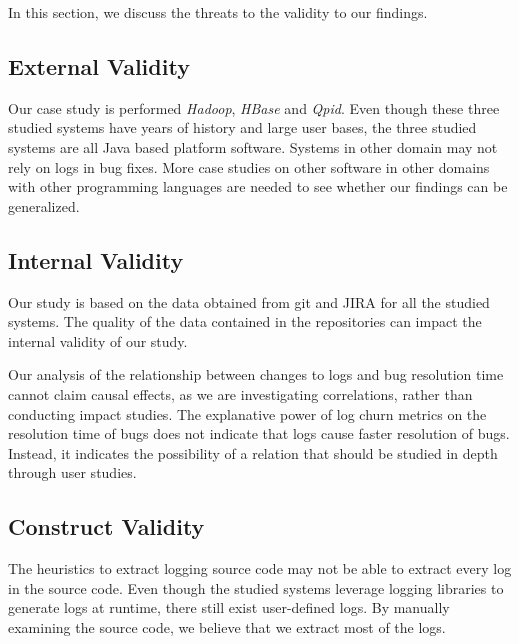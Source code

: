 
In this section, we discuss the threats to the validity to our findings.

\subsection*{External Validity}


Our case study is performed \emph{Hadoop}, \emph{HBase} and \emph{Qpid}. Even though these three studied systems have years of history and large user bases, the three studied systems are all Java based platform software. Systems in other domain may not rely on logs in bug fixes. More case studies on other software in other domains with other programming languages are needed to see whether our findings can be generalized. 




\subsection*{Internal Validity}


Our study is based on the data obtained from git and JIRA for all the studied systems. The quality of the data contained in the repositories can impact the internal validity of our study.

Our analysis of the relationship between changes to logs and bug resolution time cannot claim causal effects, as we are investigating correlations, rather than conducting impact studies. The explanative power of log churn metrics on the resolution time of bugs does not indicate that logs cause faster resolution of bugs. Instead, it indicates the possibility of a relation that should be studied in depth through user studies.


\subsection*{Construct Validity}

The heuristics to extract logging source code may not be able to extract every log in the source code. Even though the studied systems leverage logging libraries to generate logs at runtime, there still exist user-defined logs. By manually examining the source code, we believe that we extract most of the logs. %


